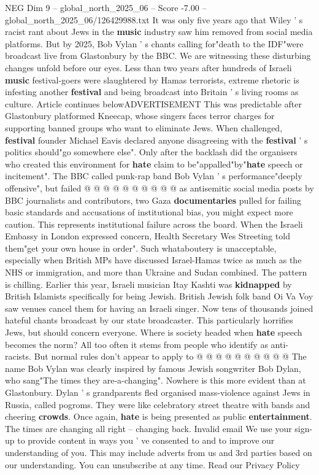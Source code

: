 \begin{textsample}{NEG Dim 9 – global\_north\_2025\_06 – Score -7.00 – global\_north\_2025\_06/126429988.txt}  \label{ex:f9_neg_096}
It was only five years ago that Wiley ' s racist rant about Jews in the \textbf{music} industry saw him removed from social media platforms.
But by 2025, Bob Vylan ' s chants calling for"death to the IDF"were broadcast live from Glastonbury by the BBC.
We are witnessing these disturbing changes unfold before our eyes.
Less than two years after hundreds of Israeli \textbf{music} festival-goers were slaughtered by Hamas terrorists, extreme rhetoric is infesting another \textbf{festival} and being broadcast into Britain ' s living rooms as culture.
Article continues belowADVERTISEMENT This was predictable after Glastonbury platformed Kneecap, whose singers faces terror charges for supporting banned groups who want to eliminate Jews.
When challenged, \textbf{festival} founder Michael Eavis declared anyone disagreeing with the \textbf{festival} ' s politics should"go somewhere else".
Only after the backlash did the organisers who created this environment for \textbf{hate} claim to be"appalled"by"\textbf{hate} speech or incitement".
The BBC called punk-rap band Bob Vylan ' s performance"deeply offensive", but failed @ @ @ @ @ @ @ @ @ @ as antisemitic social media posts by BBC journalists and contributors, two Gaza \textbf{documentaries} pulled for failing basic standards and accusations of institutional bias, you might expect more caution.
This represents institutional failure across the board.
When the Israeli Embassy in London expressed concern, Health Secretary Wes Streeting told them"get your own house in order".
Such whataboutery is unacceptable, especially when British MPs have discussed Israel-Hamas twice as much as the NHS or immigration, and more than Ukraine and Sudan combined.
The pattern is chilling.
Earlier this year, Israeli musician Itay Kashti was \textbf{kidnapped} by British Islamists specifically for being Jewish.
British Jewish folk band Oi Va Voy saw venues cancel them for having an Israeli singer.
Now tens of thousands joined hateful chants broadcast by our state broadcaster.
This particularly horrifies Jews, but should concern everyone.
Where is society headed when \textbf{hate} speech becomes the norm?
All too often it stems from people who identify as anti-racists.
But normal rules don't appear to apply to @ @ @ @ @ @ @ @ @ @ The name Bob Vylan was clearly inspired by famous Jewish songwriter Bob Dylan, who sang"The times they are-a-changing".
Nowhere is this more evident than at Glastonbury.
Dylan ' s grandparents fled organised mass-violence against Jews in Russia, called pogroms.
They were like celebratory street theatre with bands and cheering \textbf{crowds}.
Once again, \textbf{hate} is being presented as public \textbf{entertainment}.
The times are changing all right -- changing back.
Invalid email We use your sign-up to provide content in ways you ' ve consented to and to improve our understanding of you.
This may include adverts from us and 3rd parties based on our understanding.
You can unsubscribe at any time.
Read our Privacy Policy

\end{textsample}

